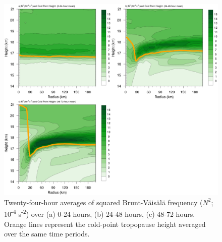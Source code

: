 \documentclass{ametsoc}
\begin{document}
\begin{figure}[ht]
\centerline{\includegraphics[width=39pc]{figures/n2-24hr-avgs.png}}
\caption{Twenty-four-hour averages of squared Brunt-V{\"a}is{\"a}l{\"a} frequency ($N^2$; 10\textsuperscript{-4} s\textsuperscript{-2}) over (a) 0-24 hours, (b) 24-48 hours, (c) 48-72 hours.
Orange lines represent the cold-point tropopause height averaged over the same time periods.}
\label{fig:n2-24hr-avgs}
\end{figure}
\end{document}
